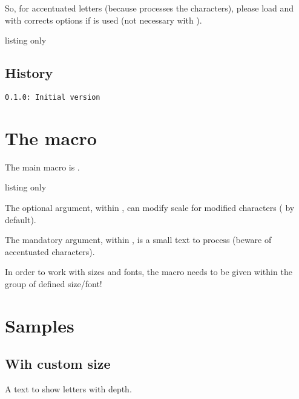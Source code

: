 \documentclass[11pt,a4paper]{ltxdoc}
\begin{document}
So, for accentuated letters (because  processes the characters), please load  and  with corrects options if  is used (not necessary with ).

\begin{DemoCode}{listing only}
\usepackage[T1]{fontenc}
\usepackage[utf8]{inputenc}
\end{DemoCode}

\vfill

\subsection{History}

\texttt{0.1.0: Initial version}

\vspace*{5mm}

\pagebreak

\section{The macro}

The main macro is \ShowCode{\\nodepth}.

\begin{DemoCode}{listing only}
\end{DemoCode}

The optional argument, within \ShowCode{[...]}, can modify scale for modified characters ( by default).

The mandatory argument, within , is a small text to process (beware of accentuated characters).

\smallskip

In order to work with sizes and fonts, the macro needs to be given within the group of defined size/font!

\section{Samples}

\subsection{Wih custom size}

\begin{DemoCode}{}
{\LARGE\ttfamily A text to show letters with depth.}

{\LARGE\ttfamily{}}\\
{\LARGE\ttfamily{}}
\end{DemoCode}
\end{document}
